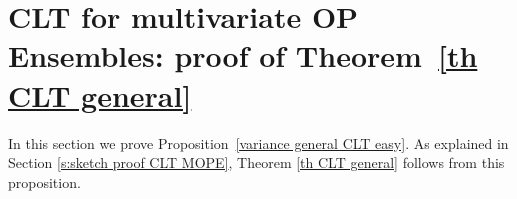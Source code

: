 \documentclass[a4paper,11pt]{article}
\numberwithin{equation}{section}
\newtheorem{lemma}[]{Lemma}
\theoremstyle{definition}
\newcommand{\eq}{\begin{equation}}
\newcommand{\qe}{\end{equation}}
\newcommand{\N}{\mathbb{N}}
\newcommand{\R}{\mathbb{R}}
\newcommand{\bs}{\boldsymbol}
\renewcommand{\d}{ {\rm d}}
\begin{document}
\section{CLT for multivariate OP Ensembles: proof of Theorem~\ref{th CLT general}}
\label{proof th1 section}








In this section we prove Proposition~\ref{variance general CLT easy}. As explained in Section
\ref{s:sketch proof CLT MOPE}, Theorem \ref{th CLT general} follows from this proposition.

\end{document}
